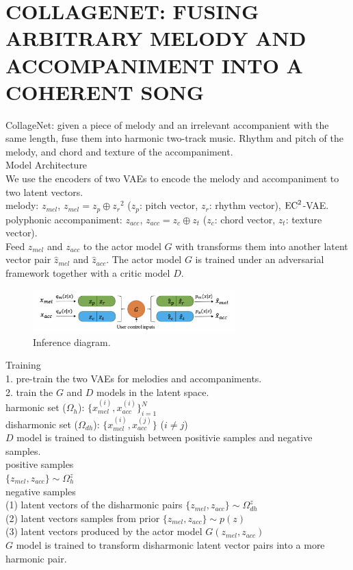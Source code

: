 \documentclass{article}
\begin{document}
\section{COLLAGENET: FUSING ARBITRARY MELODY AND ACCOMPANIMENT INTO A COHERENT SONG}
CollageNet: given a piece of melody and an irrelevant accompanient with the same length, fuse them into harmonic two-track music. Rhythm and pitch of the melody, and chord and texture of the accompaniment.\\

\noindent
Model Architecture\\
We use the encoders of two VAEs to encode the melody and accompaniment to two latent vectors.\\
\indent
melody: $z_{mel}$, $z_{mel} = z_p \oplus {z_r}^2$ ($z_p$: pitch vector, $z_r$: rhythm vector), ${\rm EC}^2$-VAE.\\
\indent
polyphonic accompaniment: $z_{acc}$, $z_{acc} = z_c \oplus z_t$ ($z_c$: chord vector, $z_t$: texture vector).\\
Feed $z_{mel}$ and $z_{acc}$ to the actor model $G$ with transforms them into another latent vector pair $\hat{z}_{mel}$ and $\hat{z}_{acc}$. The actor model $G$ is trained under an adversarial framework together with a critic model $D$.\\
\begin{figure}[H]
	\centerline{
   \includegraphics[width=0.7\textwidth]{Fig12.png}}
   \caption{Inference diagram.}
   \label{fig:example}
\end{figure}

\noindent
Training\\
1. pre-train the two VAEs for melodies and accompaniments.\\
2. train the $G$ and $D$ models in the latent space.\\
harmonic set ($\Omega_h$): $\{x_{mel}^{(i)},x_{acc}^{(i)}\}_{i=1}^N$\\
disharmonic set ($\Omega_{dh}$): $\{x_{mel}^{(i)},x_{acc}^{(j)}\}$ ($i \neq j$)\\
$D$ model is trained to distinguish between positivie samples and negative samples.\\
\indent
positive samples\\
\indent
$\{z_{mel}, z_{acc}\} \sim {\Omega}_h^z$\\
\indent
negative samples\\
\indent
(1) latent vectors of the disharmonic pairs $\{z_{mel},z_{acc}\} \sim \Omega_{dh}^z$\\
\indent
(2) latent vectors samples from prior $\{z_{mel},z_{acc}\} \sim p(z)$\\
\indent
(3) latent vectors produced by the actor model $G(z_{mel},z_{acc})$\\
$G$ model is trained to transform disharmonic latent vector pairs into a more harmonic pair.\\
\end{document}

